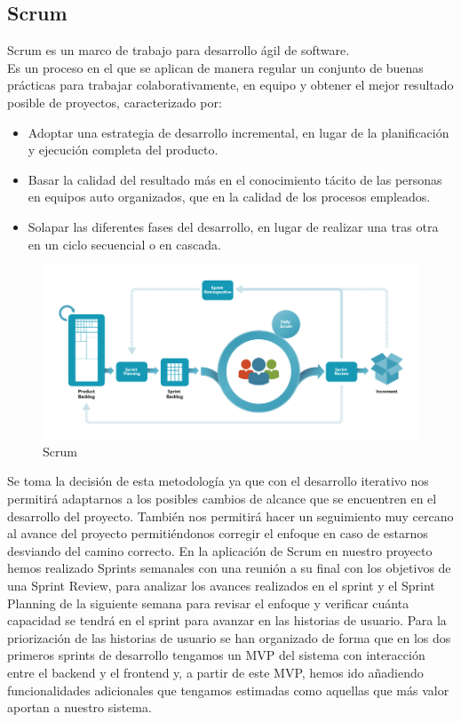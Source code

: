 \documentclass[12pt, a4paper, twoside]{book}
\begin{document}
	\subsection{Scrum}
	Scrum es un marco de trabajo para desarrollo ágil de software.\\
	Es un proceso en el que se aplican de manera regular un conjunto de buenas prácticas para trabajar colaborativamente, en equipo y obtener el mejor resultado posible de proyectos, caracterizado por:
	\begin{itemize}
		\item Adoptar una estrategia de desarrollo incremental, en lugar de la planificación y ejecución completa del producto.
		\item Basar la calidad del resultado más en el conocimiento tácito de las personas en equipos auto organizados, que en la calidad de los procesos empleados.
		\item Solapar las diferentes fases del desarrollo, en lugar de realizar una tras otra en un ciclo secuencial o en cascada.
	\end{itemize}	
	\begin{figure}[H]
		\centering
		\includegraphics[width=15cm]{Imagenes/Scrum.png}
		\caption{Scrum}\label{Scrum}
	\end{figure}
	Se toma la decisión de esta metodología ya que con el desarrollo iterativo nos permitirá adaptarnos a los posibles cambios de alcance que se encuentren en el desarrollo del proyecto. También nos permitirá hacer un seguimiento muy cercano al avance del proyecto permitiéndonos corregir el enfoque en caso de estarnos desviando del camino correcto.
	En la aplicación de Scrum en nuestro proyecto hemos realizado Sprints semanales con una reunión a su final con los objetivos de una Sprint Review, para analizar los avances realizados en el sprint y el Sprint Planning de la siguiente semana para revisar el enfoque y verificar cuánta capacidad se tendrá en el sprint para avanzar en las historias de usuario. Para la priorización de las historias de usuario se han organizado de forma que en los dos primeros sprints de desarrollo tengamos un MVP del sistema con interacción entre el backend y el frontend y, a partir de este MVP, hemos ido añadiendo funcionalidades adicionales que tengamos estimadas como aquellas que más valor aportan a nuestro sistema.
\end{document}
